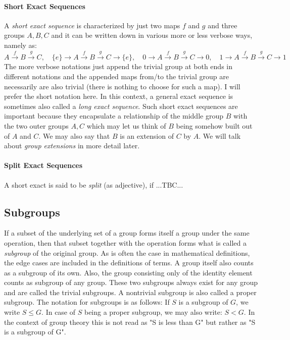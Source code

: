 
\paragraph{Short Exact Sequences}
A \emph{short exact sequence} is characterized by just two maps $f$ and $g$ and three groups $A,B,C$ and it can be written down in various more or less verbose ways, namely as:
\begin{equation}
 A \xrightarrow{f} B \xrightarrow{g} C,
 \quad 
 \{e\} \xrightarrow{} A \xrightarrow{f} B \xrightarrow{g} C \xrightarrow{} \{e\},
 \quad 
 0 \xrightarrow{} A \xrightarrow{f} B \xrightarrow{g} C \xrightarrow{} 0,
 \quad
 1 \xrightarrow{} A \xrightarrow{f} B \xrightarrow{g} C \xrightarrow{} 1
\end{equation}
The more verbose notations just append the trivial group at both ends in different notations and the appended maps from/to the trivial group are necessarily are also trivial (there is nothing to choose for such a map). I will prefer the short notation here. In this context, a general exact sequence is sometimes also called a \emph{long exact sequence}. Such short exact sequences are important because they encapsulate a relationship of the middle group $B$ with the two outer groups $A,C$ which may let us think of $B$ being somehow built out of $A$ and $C$. We may also say that $B$ is an extension of $C$ by $A$. We will talk about \emph{group extensions} in more detail later.



\paragraph{Split Exact Sequences}
A short exact is said to be \emph{split} (as adjective), if ...TBC...



\subsection{Subgroups}
If a subset of the underlying set of a group forms itself a group under the same operation, then that subset together with the operation forms what is called a \emph{subgroup} of the original group. As is often the case in mathematical definitions, the edge cases are included in the definitions of terms. A group itself also counts as a subgroup of its own. Also, the group consisting only of the identity element counts as subgroup of any group. These two subgroups always exist for any group and are called the trivial subgroups. A nontrivial subgroup is also called a proper subgroup. The notation for subgroups is as follows: If $S$ is a subgroup of $G$, we write $S \leq G$. In case of $S$ being a proper subgroup, we may also write: $S < G$. In the context of group theory this is not read as "S is less than G" but rather as "S is a subgroup of G".

